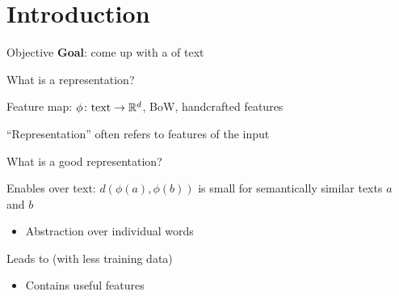 \documentclass[usenames,dvipsnames,notes,11pt,aspectratio=169]{beamer}
\newcommand{\pdfnote}[1]{}
\begin{document}
\section{Introduction}

\begin{frame}
    {Objective}    
    \textbf{Goal}: come up with a  of text\\
    \begin{wideitemize}[<+->]
        \item What is a representation?
            \begin{wideitemize}
                \item Feature map: $\phi\colon \text{text} \rightarrow \mathbb{R}^d$, \eg BoW, handcrafted features
                \item ``Representation'' often refers to  features of the input
            \end{wideitemize}
        \item What is a good representation?
            \begin{wideitemize}
                \item Enables  over text: 
                    $d(\phi(a), \phi(b))$ is small for semantically similar texts $a$ and $b$
                    \begin{itemize}[<.->]
                        \item Abstraction over individual words 
                    \end{itemize}
                \item Leads to  (with less training data)
                    \begin{itemize}[<.->]
                        \item Contains useful features
                    \end{itemize}
            \end{wideitemize}
    \end{wideitemize}
    \pause
\end{frame}

%
%
\end{document}
